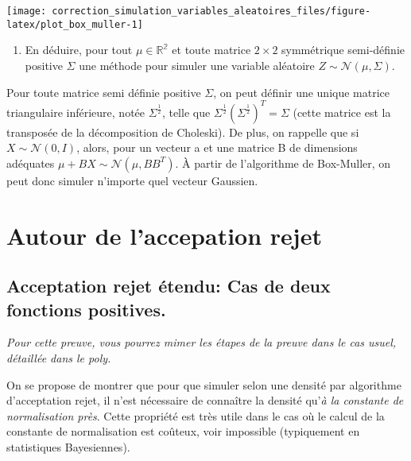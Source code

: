 \documentclass[
]{article}
\providecommand{\tightlist}{%
  \setlength{\itemsep}{0pt}\setlength{\parskip}{0pt}}
\newenvironment{Correction}%
  { \vspace{\baselineskip}\begin{mdframed}[backgroundcolor=my_green]}%
  {\end{mdframed}}
\begin{document}
\begin{center}\texttt{[image: correction\_simulation\_variables\_aleatoires\_files/figure-latex/plot\_box\_muller-1]} \end{center}

\begin{enumerate}
\def\labelenumi{\arabic{enumi}.}
\setcounter{enumi}{2}
\tightlist
\item
  En déduire, pour tout \(\mu \in \mathbb{R^2}\) et toute matrice
  \(2\times 2\) symmétrique semi-définie positive \(\Sigma\) une méthode
  pour simuler une variable aléatoire
  \(Z\sim \mathcal{N}(\mu, \Sigma)\).
\end{enumerate}

\begin{Correction}
Pour toute matrice semi définie positive $\Sigma$, on peut définir une unique matrice triangulaire inférieure, notée $\Sigma^{\frac{1}{2}}$, telle que $\Sigma^{\frac{1}{2}}(\Sigma^{\frac{1}{2}})^T = \Sigma$ (cette matrice est la transposée de la décomposition de Choleski).
De plus, on rappelle que si $X \sim \mathcal{N}(0, I)$, alors, pour un vecteur a et une matrice B de dimensions adéquates $\mu + BX \sim \mathcal{N}(\mu, BB^T)$. À partir de l'algorithme de Box-Muller, on peut donc simuler n'importe quel vecteur Gaussien.
\end{Correction}

\hypertarget{autour-de-laccepation-rejet}{%
\section{Autour de l'accepation
rejet}\label{autour-de-laccepation-rejet}}

\hypertarget{acceptation-rejet-uxe9tendu-cas-de-deux-fonctions-positives.}{%
\subsection{Acceptation rejet étendu: Cas de deux fonctions
positives.}\label{acceptation-rejet-uxe9tendu-cas-de-deux-fonctions-positives.}}

\emph{Pour cette preuve, vous pourrez mimer les étapes de la preuve dans
le cas usuel, détaillée dans le poly.}

On se propose de montrer que pour que simuler selon une densité par
algorithme d'acceptation rejet, il n'est nécessaire de connaître la
densité qu'\emph{à la constante de normalisation près}. Cette propriété
est très utile dans le cas où le calcul de la constante de normalisation
est coûteux, voir impossible (typiquement en statistiques Bayesiennes).
\end{document}
